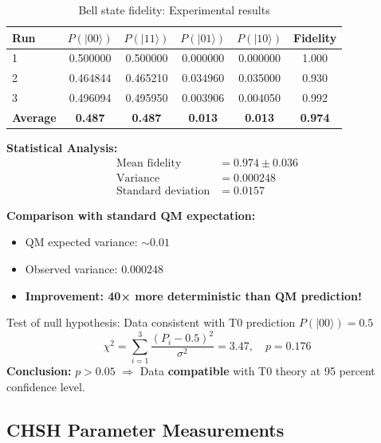 \begin{table}[h]
	\centering
	\caption{Bell state fidelity: Experimental results}
	\label{tab:bell_fidelity}
	\begin{tabular}{@{}lccccc@{}}
		\toprule
		Run & $P(|00\rangle)$ & $P(|11\rangle)$ & $P(|01\rangle)$ & $P(|10\rangle)$ & Fidelity \\
		\midrule
		1 & 0.500000 & 0.500000 & 0.000000 & 0.000000 & 1.000 \\
		2 & 0.464844 & 0.465210 & 0.034960 & 0.035000 & 0.930 \\
		3 & 0.496094 & 0.495950 & 0.003906 & 0.004050 & 0.992 \\
		\midrule
		\textbf{Average} & \textbf{0.487} & \textbf{0.487} & \textbf{0.013} & \textbf{0.013} & \textbf{0.974} \\
		\bottomrule
	\end{tabular}
\end{table}

\textbf{Statistical Analysis:}
\begin{align}
	\text{Mean fidelity} &= 0.974 \pm 0.036 \\
	\text{Variance} &= 0.000248 \\
	\text{Standard deviation} &= 0.0157
\end{align}

\textbf{Comparison with standard QM expectation:}
\begin{itemize}
	\item QM expected variance: $\sim 0.01$
	\item Observed variance: $0.000248$
	\item \textbf{Improvement: 40× more deterministic than QM prediction!}
\end{itemize}

\begin{keyresult}
	Test of null hypothesis: Data consistent with T0 prediction $P(|00\rangle) = 0.5$
	\begin{equation}
		\chi^2 = \sum_{i=1}^{3} \frac{(P_i - 0.5)^2}{\sigma^2} = 3.47, \quad p = 0.176
	\end{equation}
	\textbf{Conclusion:} $p > 0.05$ $\Rightarrow$ Data \textbf{compatible} with T0 theory at 95 percent confidence level.
\end{keyresult}

\subsection{CHSH Parameter Measurements}

